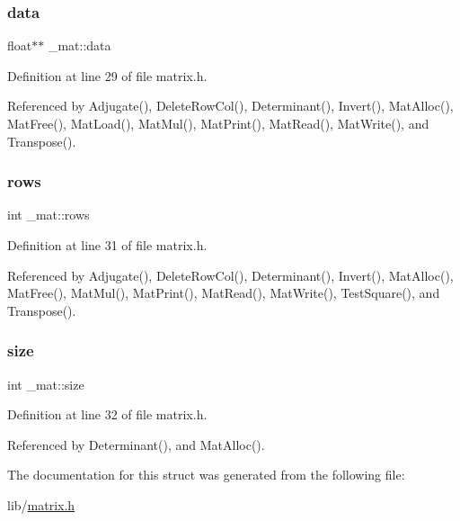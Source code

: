\mbox{\label{struct__mat_a00dcd82a8de11b7f16f7edfde55bcfae}} 
\subsubsection{\texorpdfstring{data}{data}}
{\footnotesize\ttfamily float$\ast$$\ast$ \+\_\+mat\+::data}



Definition at line 29 of file matrix.\+h.



Referenced by Adjugate(), Delete\+Row\+Col(), Determinant(), Invert(), Mat\+Alloc(), Mat\+Free(), Mat\+Load(), Mat\+Mul(), Mat\+Print(), Mat\+Read(), Mat\+Write(), and Transpose().

\mbox{\label{struct__mat_a5e6bcb8b0c0239ca9b782c48b0b3c98a}} 
\subsubsection{\texorpdfstring{rows}{rows}}
{\footnotesize\ttfamily int \+\_\+mat\+::rows}



Definition at line 31 of file matrix.\+h.



Referenced by Adjugate(), Delete\+Row\+Col(), Determinant(), Invert(), Mat\+Alloc(), Mat\+Free(), Mat\+Mul(), Mat\+Print(), Mat\+Read(), Mat\+Write(), Test\+Square(), and Transpose().

\mbox{\label{struct__mat_ab54203ad7b60fc23832cb3b2a863857f}} 
\subsubsection{\texorpdfstring{size}{size}}
{\footnotesize\ttfamily int \+\_\+mat\+::size}



Definition at line 32 of file matrix.\+h.



Referenced by Determinant(), and Mat\+Alloc().



The documentation for this struct was generated from the following file\+:\begin{DoxyCompactItemize}
\item 
lib/\hyperlink{matrix_8h}{matrix.\+h}\end{DoxyCompactItemize}
